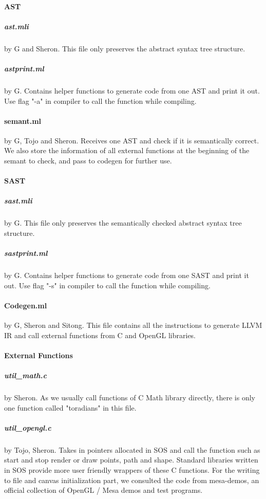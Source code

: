 \documentclass[main.tex]{subfiles}
\begin{document}
	\paragraph{AST}
	    \subparagraph{ast.mli} by G and Sheron. This file only preserves the abstract syntax tree structure.
	    \subparagraph{astprint.ml} by G. Contains helper functions to generate code from one AST and print it out. Use flag "-a" in compiler to call the function while compiling.
	    
    \paragraph{semant.ml} by G, Tojo and Sheron. Receives one AST and check if it is semantically correct. We also store the information of all external functions at the beginning of the semant to check, and pass to codegen for further use.
	
	\paragraph{SAST}
	    \subparagraph{sast.mli} by G. This file only preserves the semantically checked abstract syntax tree structure.
	    \subparagraph{sastprint.ml} by G. Contains helper functions to generate code from one SAST and print it out. Use flag "-s" in compiler to call the function while compiling.
	    
    \paragraph{Codegen.ml} by G, Sheron and Sitong. This file contains all the instructions to generate LLVM IR and call external functions from C and OpenGL libraries.
    
    \paragraph{External Functions}
        \subparagraph{util\_math.c} by Sheron. As we usually call functions of C Math library directly, there is only one function called "toradians" in this file.
        
        \subparagraph{util\_opengl.c} by Tojo, Sheron. Takes in pointers allocated in SOS and call the function such as start and stop render or draw points, path and shape. Standard libraries written in SOS provide more user friendly wrappers of these C functions. For the writing to file and canvas initialization part, we consulted the code from mesa-demos, an official collection of OpenGL / Mesa demos and test programs.
    
\end{document}

